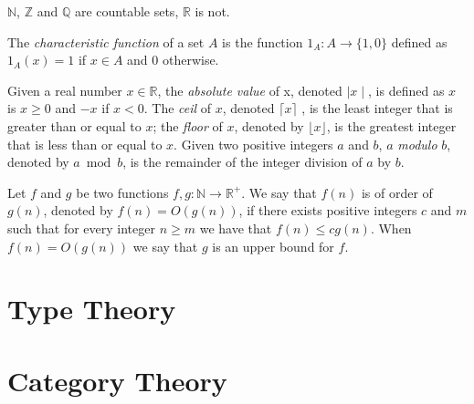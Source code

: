\begin{example}
$\mathbb{N}$, $\mathbb{Z}$ and $\mathbb{Q}$ are countable sets, $\mathbb{R}$ is not.
\end{example}

The \emph{characteristic function} of a set $A$ is the function $1_A : A \rightarrow \{1, 0\}$ defined as $1_A(x) = 1$ if $x \in A$ and $0$ otherwise.

Given a real number $x \in \mathbb{R}$, the \emph{absolute value} of x, denoted $\mid x \mid$, is defined as $x$ is $x \geq 0$ and $-x$ if $x < 0$. The \emph{ceil} of $x$, denoted $\lceil x \rceil$ , is the least integer that is greater than or equal to $x$; the \emph{floor} of $x$, denoted by $\lfloor x \rfloor$, is the greatest integer that is less than or equal to $x$. Given two positive integers $a$ and $b$, $a$ \emph{modulo} $b$, denoted by $a \bmod b$, is the remainder of the integer division of $a$ by $b$.

Let $f$ and $g$ be two functions $f,g:\mathbb{N}\rightarrow\mathbb{R}^{+}$. We say that $f(n)$ is of order of $g(n)$, denoted by $f(n)=O(g(n))$, if there exists positive integers $c$ and $m$ such that for every integer $n \geq m$ we have that $f(n)\leq cg(n)$. When $f(n)=O(g(n))$ we say that $g$ is an upper bound for $f$.


\section{Type Theory}

\section{Category Theory}


